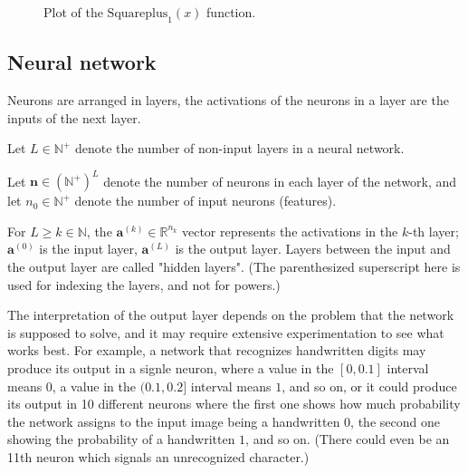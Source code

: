 \documentclass[titlepage]{article}
\begin{document}
          \begin{figure}[!htb]
            \centering
            \caption{%
              Plot of the $\text{Squareplus}_{1}(x)$ function.
            }
          \end{figure}

\newpage

    \subsection{Neural network}

      Neurons are arranged in layers, the activations of the neurons in a layer
      are the inputs of the next layer.

      Let $L \in \mathbb{N}^+$ denote the number of non-input layers in a
      neural network.

      Let $\mathbf{n} \in \left( {\mathbb{N}^+} \right)^L$ denote the number of
      neurons in each layer of the network, and let $n_0 \in \mathbb{N}^+$
      denote the number of input neurons (features).

      For $L \geq k \in \mathbb{N}$, the $\mathbf{a}^{(k)} \in
      \mathbb{R}^{n_k}$ vector represents the activations in the $k$-th layer;
      $\mathbf{a}^{(0)}$ is the input layer, $\mathbf{a}^{(L)}$ is the output
      layer. Layers between the input and the output layer are called "hidden
      layers". (The parenthesized superscript here is used for indexing the
      layers, and not for powers.)

      The interpretation of the output layer depends on the problem that the
      network is supposed to solve, and it may require extensive experimentation
      to see what works best. For example, a network that recognizes
      handwritten digits may produce its output in a signle neuron, where a
      value in the $[0, 0.1]$ interval means $0$, a value in the $(0.1, 0.2]$
      interval means $1$, and so on, or it could produce its output in 10
      different neurons where the first one shows how much probability the
      network assigns to the input image being a handwritten $0$, the second one
      showing the probability of a handwritten $1$, and so on. (There could even
      be an 11th neuron which signals an unrecognized character.)
\end{document}
